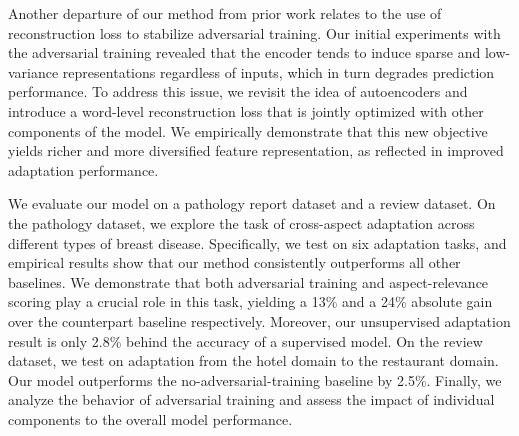 Another departure of our method from prior work relates to the use of reconstruction loss to stabilize adversarial training. Our initial experiments with the adversarial training revealed that the encoder tends to induce sparse and low-variance representations regardless of inputs, which in turn degrades prediction performance. To address this issue, we revisit the idea of autoencoders and introduce a word-level reconstruction loss that is jointly optimized with other components of the model. We empirically demonstrate that this new objective yields richer and more diversified feature representation, as reflected in improved adaptation performance.

We evaluate our model on a pathology report dataset and a review dataset. On the pathology dataset, we explore the task of cross-aspect adaptation across different types of breast disease. Specifically, we test on six adaptation tasks, and empirical results show that our method consistently outperforms all other baselines. We demonstrate that both adversarial training and aspect-relevance scoring play a crucial role in this task, yielding a 13\% and a 24\% absolute gain over the counterpart baseline respectively. Moreover, our unsupervised adaptation result is only 2.8\% behind the accuracy of a supervised model. On the review dataset, we test on adaptation from the hotel domain to the restaurant domain. Our model outperforms the no-adversarial-training baseline by 2.5\%. Finally, we analyze the behavior of adversarial training and assess the impact of individual components to the overall model performance.

